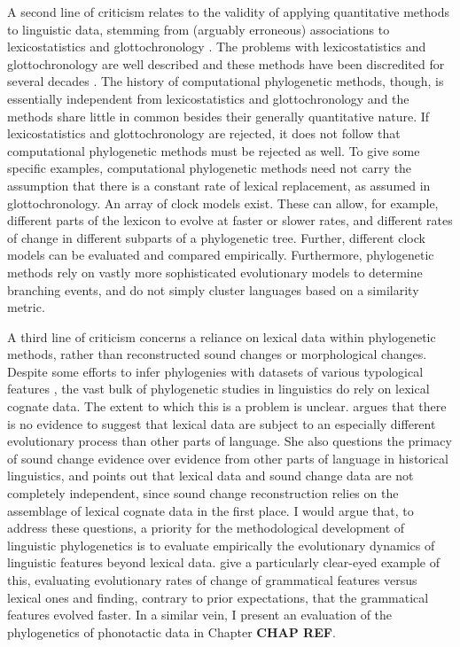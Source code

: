 A second line of criticism relates to the validity of applying quantitative methods to linguistic data, stemming from (arguably erroneous) associations to lexicostatistics and glottochronology \autocites{eska_recent_2004}{holm_new_2007}. The problems with lexicostatistics and glottochronology are well described and these methods have been discredited for several decades \autocite[see][pp.~285--286]{bowern_computational_2018}. The history of computational phylogenetic methods, though, is essentially independent from lexicostatistics and glottochronology and the methods share little in common besides their generally quantitative nature. If lexicostatistics and glottochronology are rejected, it does not follow that computational phylogenetic methods must be rejected as well. To give some specific examples, computational phylogenetic methods need not carry the assumption that there is a constant rate of lexical replacement, as assumed in glottochronology. An array of clock models exist. These can allow, for example, different parts of the lexicon to evolve at faster or slower rates, and different rates of change in different subparts of a phylogenetic tree. Further, different clock models can be evaluated and compared empirically. Furthermore, phylogenetic methods rely on vastly more sophisticated evolutionary models to determine branching events, and do not simply cluster languages based on a similarity metric.

A third line of criticism concerns a reliance on lexical data within phylogenetic methods, rather than reconstructed sound changes or morphological changes. Despite some efforts to infer phylogenies with datasets of various typological features \autocites[e.g.][]{dunn_structural_2005}{dunn_structural_2008}, the vast bulk of phylogenetic studies in linguistics do rely on lexical cognate data. The extent to which this is a problem is unclear. \textcite{bowern_computational_2018} argues that there is no evidence to suggest that lexical data are subject to an especially different evolutionary process than other parts of language. She also questions the primacy of sound change evidence over evidence from other parts of language in historical linguistics, and points out that lexical data and sound change data are not completely independent, since sound change reconstruction relies on the assemblage of lexical cognate data in the first place. I would argue that, to address these questions, a priority for the methodological development of linguistic phylogenetics is to evaluate empirically the evolutionary dynamics of linguistic features beyond lexical data. \textcite{greenhill_evolutionary_2017} give a particularly clear-eyed example of this, evaluating evolutionary rates of change of grammatical features versus lexical ones and finding, contrary to prior expectations, that the grammatical features evolved faster. In a similar vein, I present an evaluation of the phylogenetics of phonotactic data in Chapter \textbf{CHAP REF}.

